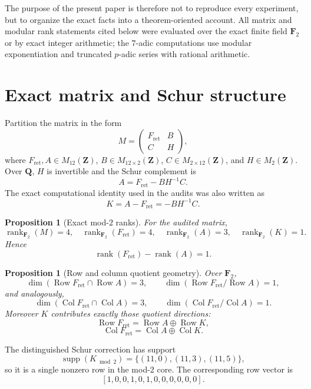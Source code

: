 \documentclass[11pt]{article}
\newtheorem{proposition}[theorem]{Proposition}
\theoremstyle{definition}
\theoremstyle{remark}
\begin{document}
The purpose of the present paper is therefore not to reproduce every experiment, but to organize the exact facts into a theorem-oriented account. All matrix and modular rank statements cited below were evaluated over the exact finite field $\mathbf F_2$ or by exact integer arithmetic; the $7$-adic computations use modular exponentiation and truncated $p$-adic series with rational arithmetic.

\section{Exact matrix and Schur structure}
Partition the matrix in the form
\[
M=
\begin{pmatrix}
F_{\mathrm{ret}} & B\\
C & H
\end{pmatrix},
\]
where $F_{\mathrm{ret}},A\in M_{12}(\mathbf Z)$, $B\in M_{12\times2}(\mathbf Z)$, $C\in M_{2\times12}(\mathbf Z)$, and $H\in M_2(\mathbf Z)$. Over $\mathbf Q$, $H$ is invertible and the Schur complement is
\[
A=F_{\mathrm{ret}}-BH^{-1}C.
\]
The exact computational identity used in the audits was also written as
\[
K=A-F_{\mathrm{ret}}=-BH^{-1}C.
\]

\begin{proposition}[Exact mod-$2$ ranks]
For the audited matrix,
\[
\operatorname{rank}_{\mathbf F_2}(M)=4,
\quad
\operatorname{rank}_{\mathbf F_2}(F_{\mathrm{ret}})=4,
\quad
\operatorname{rank}_{\mathbf F_2}(A)=3,
\quad
\operatorname{rank}_{\mathbf F_2}(K)=1.
\]
Hence
\[
\operatorname{rank}(F_{\mathrm{ret}})-\operatorname{rank}(A)=1.
\]
\end{proposition}

\begin{proposition}[Row and column quotient geometry]
Over $\mathbf F_2$,
\[
\dim(\operatorname{Row}F_{\mathrm{ret}}\cap\operatorname{Row}A)=3,
\qquad
\dim(\operatorname{Row}F_{\mathrm{ret}}/\operatorname{Row}A)=1,
\]
and analogously,
\[
\dim(\operatorname{Col}F_{\mathrm{ret}}\cap\operatorname{Col}A)=3,
\qquad
\dim(\operatorname{Col}F_{\mathrm{ret}}/\operatorname{Col}A)=1.
\]
Moreover $K$ contributes exactly those quotient directions:
\[
\operatorname{Row}F_{\mathrm{ret}}
=
\operatorname{Row}A\oplus \operatorname{Row}K,
\]
\[
\operatorname{Col}F_{\mathrm{ret}}
=
\operatorname{Col}A\oplus \operatorname{Col}K.
\]
\end{proposition}

The distinguished Schur correction has support
\[
\operatorname{supp}(K_{\bmod2})=\{(11,0),(11,3),(11,5)\},
\]
so it is a single nonzero row in the mod-$2$ core. The corresponding row vector is
\[
[1,0,0,1,0,1,0,0,0,0,0,0].
\]
\end{document}
